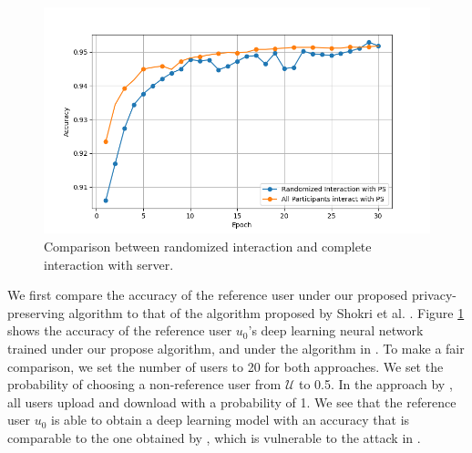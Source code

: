 \documentclass[conference]{IEEEtran}
\begin{document}

\begin{figure}[!h]
\centering
\includegraphics[width=0.9\columnwidth, keepaspectratio]{RandomVsAllGrid}
\caption{Comparison between randomized interaction and complete interaction with server. }
\label{fig:RandVsAll}
\end{figure}
We first compare the accuracy of the reference user under our proposed privacy-preserving algorithm to that of the algorithm proposed
by Shokri et al. \cite{shokri2015privacy}. 
Figure \ref{fig:RandVsAll} shows the accuracy of the reference user $u_0$'s deep learning
neural network trained under our propose algorithm, and under the algorithm in \cite{shokri2015privacy}. To make a fair comparison, 
we  set the number of users to 20 for both approaches. We set the probability of choosing a non-reference user from $\mathcal{U}$ to
0.5.  In the approach by \cite{shokri2015privacy}, all users upload and download with a probability of 1. 
We see that the reference user $u_0$ is able to obtain a deep learning model with an accuracy that is comparable to the one
obtained by \cite{shokri2015privacy}, which is vulnerable to the attack in \cite{hitaj2017deep}.
\end{document}
